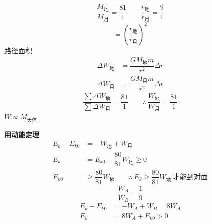 \[ \dfrac{M_{\text{地}}}{M_{\text{月}}}=\dfrac{81}{1}\qquad \dfrac{r_{\text{地}}}{r_{\text{月}}}=\dfrac{9}{1} \]
\[ =\left(\dfrac{r_{\text{地}}}{r_{\text{月}}}\right)^{2} \]
路径面积
\begin{align*}
\Delta W_{\text{地}}&=\dfrac{GM_{\text{地}}m}{r^{2}}\Delta r\\
\Delta W_{\text{月}}&=\dfrac{GM_{\text{月}}m}{r^{2}}\Delta r
\end{align*}
\[ \dfrac{\sum\Delta W_{\text{地}}}{\sum\Delta W_{\text{月}}}=\dfrac{81}{1}\qquad \therefore\ \dfrac{W_{\text{地}}}{W_{\text{月}}}=\dfrac{81}{1} \]
\textbf{$W\propto M_{\text{天体}}$}

\textbf{用动能定理}
\begin{align*}
E_k-E_{k0}&=-W_{\text{地}}+W_{\text{月}}\\
E_k&=E_{k0}-\dfrac{80}{81}W_{\text{地}}\ge 0\\
E_{k0}&\ge\dfrac{80}{81}W_{\text{地}}\qquad \therefore\ E_k\ge\dfrac{80}{81}W_{\text{地}}\ \text{才能到对面}
\end{align*}
\[ \dfrac{W_A}{W_B}=\dfrac{1}{9} \]
\begin{align*}
E_k-E_{k0}&=-W_A+W_B=8W_A\\
E_k&=8W_A+E_{k0}>0
\end{align*}

